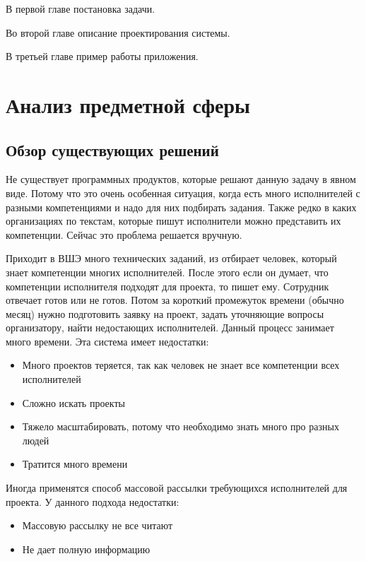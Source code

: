 \documentclass[PI,KR]{HSEUniversity}
\begin{document}
В первой главе постановка задачи.

Во второй главе описание проектирования системы.

В третьей главе пример работы приложения.

\chapter{Анализ предметной сферы}
\section{Обзор существующих решений}
Не существует программных продуктов, которые решают данную задачу в явном виде. Потому что это очень особенная ситуация, когда есть много исполнителей с разными компетенциями и надо для них подбирать задания. Также редко в каких организациях по текстам, которые пишут исполнители можно представить их компетенции. Сейчас это проблема решается вручную.

Приходит в ВШЭ много технических заданий, из отбирает человек, который знает компетенции многих исполнителей. После этого если он думает, что компетенции исполнителя подходят для проекта, то пишет ему. Сотрудник отвечает готов или не готов. Потом за короткий промежуток времени (обычно месяц) нужно подготовить заявку на проект, задать уточняющие вопросы организатору, найти недостающих исполнителей. Данный процесс занимает много времени. Эта система имеет недостатки:
\begin{itemize}
	\item Много проектов теряется, так как человек не знает все компетенции всех исполнителей
	\item Сложно искать проекты
	\item Тяжело масштабировать, потому что необходимо знать много про разных людей
	\item Тратится много времени
\end{itemize}

Иногда применятся способ массовой рассылки требующихся исполнителей для проекта. У данного подхода недостатки: 
\begin{itemize}
	\item Массовую рассылку не все читают
	\item Не дает полную информацию
\end{itemize}
\end{document}
